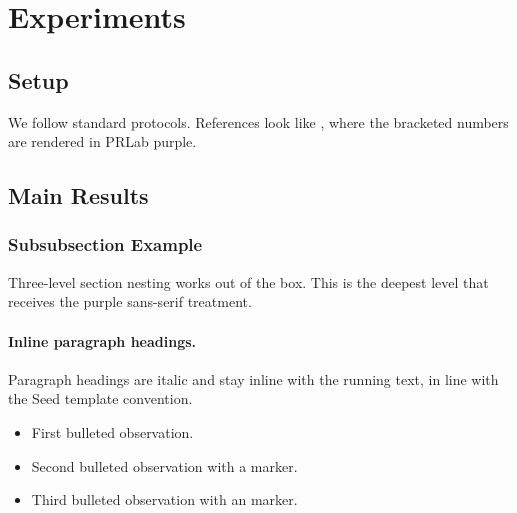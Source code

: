 \section{Experiments}
\label{sec:experiments}

\subsection{Setup}

We follow standard protocols. References look like
\citep{he2016deep,dosovitskiy2020image}, where the bracketed numbers are
rendered in PRLab purple.

\subsection{Main Results}

\subsubsection{Subsubsection Example}

Three-level section nesting works out of the box. This is the deepest level
that receives the purple sans-serif treatment.

\paragraph{Inline paragraph headings.}
Paragraph headings are italic and stay inline with the running text, in line
with the Seed template convention.

\begin{itemize}
  \item First bulleted observation.
  \item Second bulleted observation with a \cmark{} marker.
  \item Third bulleted observation with an \xmark{} marker.
\end{itemize}
